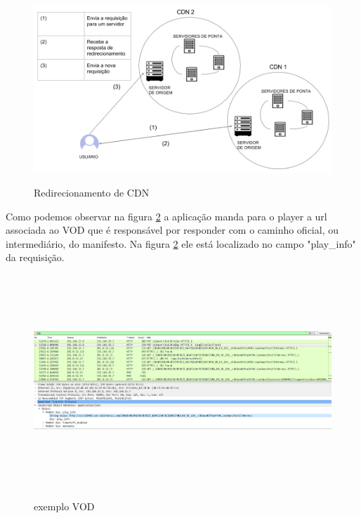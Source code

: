 \begin{figure}[H]
\caption{Redirecionamento de CDN}
\includegraphics[width=15cm]{Figuras/vod_redirect_exemple.png} 
\label{figura:vod_redirect_exemple}
\end{figure}

Como podemos observar na figura \ref{figura:exemplo_vod_1} a aplica\c{c}\~ao manda para o player a url associada ao VOD que \'e respons\'avel por responder com o caminho oficial, ou intermedi\'ario, do manifesto. Na figura \ref{figura:exemplo_vod_1} ele est\'a localizado no campo "play\_info" da requisi\c{c}\~ao.
\begin{figure}[H]
\caption{exemplo VOD}
\includegraphics[height=8cm]{Figuras/exemplo_vod_1.png} 
\label{figura:exemplo_vod_1}
\end{figure}

